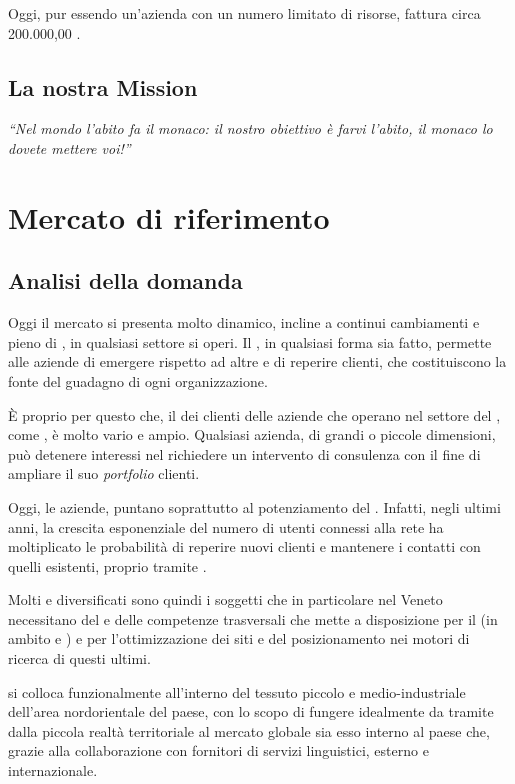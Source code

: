 Oggi, pur essendo un'azienda con un numero limitato di risorse, fattura circa  200.000,00 \text{\euro}.

\section{La nostra Mission}

\textit{``Nel mondo l'abito fa il monaco: il nostro obiettivo è farvi l'abito, il monaco lo dovete mettere voi!''}


\chapter{Mercato di riferimento}
\section{Analisi della domanda}\label{sec:domanda}

Oggi il mercato si presenta molto dinamico, incline a continui cambiamenti e pieno di  , in qualsiasi settore si operi. Il \mktg , in qualsiasi forma sia fatto, permette alle aziende di emergere rispetto ad altre e di reperire clienti, che costituiscono la fonte del guadagno di ogni organizzazione.

È  proprio per questo che, il  dei clienti delle aziende che operano nel settore del \mktg, come \customer , è molto vario e ampio. Qualsiasi azienda, di grandi o piccole dimensioni, può detenere interessi nel richiedere un intervento di consulenza \mktg con il fine di ampliare il suo \textit{portfolio} clienti.

Oggi, le aziende, puntano soprattutto al potenziamento del \mktg {}. Infatti, negli ultimi anni, la crescita esponenziale del numero di utenti connessi alla rete ha moltiplicato le probabilità di reperire nuovi clienti e mantenere i contatti con quelli esistenti, proprio tramite .

Molti e diversificati sono quindi i soggetti che in particolare nel Veneto necessitano del  e delle competenze trasversali che \customer mette a disposizione per il  \mktg (in ambito  e ) e per l'ottimizzazione dei siti e del posizionamento nei motori di ricerca di questi ultimi.

\customer si colloca funzionalmente all'interno del tessuto piccolo e medio-industriale dell'area nordorientale del paese, con lo scopo di fungere idealmente da tramite dalla piccola realtà territoriale al mercato globale sia esso interno al paese che, grazie alla collaborazione con fornitori di servizi linguistici, esterno e internazionale.

